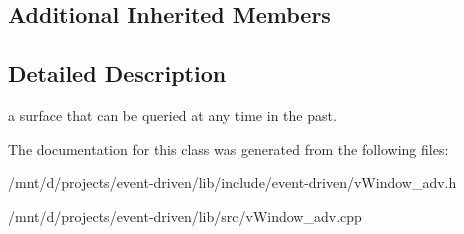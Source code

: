 \subsection*{Additional Inherited Members}


\subsection{Detailed Description}
a surface that can be queried at any time in the past. 

The documentation for this class was generated from the following files\+:\begin{DoxyCompactItemize}
\item 
/mnt/d/projects/event-\/driven/lib/include/event-\/driven/v\+Window\+\_\+adv.\+h\item 
/mnt/d/projects/event-\/driven/lib/src/v\+Window\+\_\+adv.\+cpp\end{DoxyCompactItemize}
